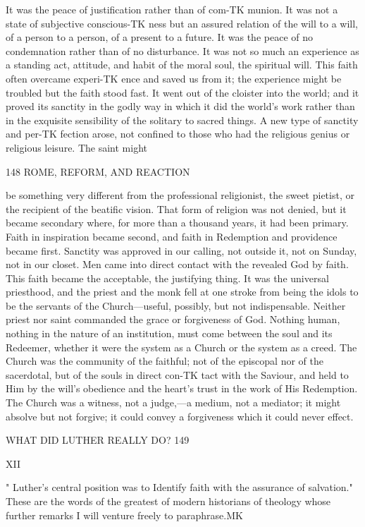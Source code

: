\documentclass[12pt,a5paper,twoside]{book}
\begin{document}
{It was the peace of justification rather than of com-TK
munion. It was not a state of subjective conscious-TK
ness but an assured relation of the will to a will, of 
a person to a person, of a present to a future. It 
was the peace of no condemnation rather than of no 
disturbance. It was not so much an experience as 
a standing act, attitude, and habit of the moral soul, 
the spiritual will. This faith often overcame experi-TK
ence and saved us from it; the experience might be 
troubled but the faith stood fast. It went out of 
the cloister into the world; and it proved its sanctity 
in the godly way in which it did the world's work 
rather than in the exquisite sensibility of the solitary 
to sacred things. A new type of sanctity and per-TK
fection arose, not confined to those who had the 
religious genius or religious leisure. The saint might 



148 ROME, REFORM, AND REACTION 

be something very different from the professional 
religionist, the sweet pietist, or the recipient of the 
beatific vision. That form of religion was not 
denied, but it became secondary where, for more 
than a thousand years, it had been primary. Faith 
in inspiration became second, and faith in Redemption 
and providence became first. Sanctity was approved 
in our calling, not outside it, not on Sunday, not in 
our closet. Men came into direct contact with 
the revealed God by faith. This faith became the 
acceptable, the justifying thing. It was the universal 
priesthood, and the priest and the monk fell at one 
stroke from being the idols to be the servants of 
the Church---useful, possibly, but not indispensable. 
Neither priest nor saint commanded the grace or 
forgiveness of God. Nothing human, nothing in the 
nature of an institution, must come between the soul 
and its Redeemer, whether it were the system as a 
Church or the system as a creed. The Church was 
the community of the faithful; not of the episcopal 
nor of the sacerdotal, but of the souls in direct con-TK
tact with the Saviour, and held to Him by the will's 
obedience and the heart's trust in the work of His 
Redemption. The Church was a witness, not a 
judge,---a medium, not a mediator; it might absolve 
but not forgive; it could convey a forgiveness which 
it could never effect. 



WHAT DID LUTHER REALLY DO? 149 

XII 

" Luther's central position was to Identify faith with 
the assurance of salvation." These are the words of 
the greatest of modern historians of theology whose 
further remarks I will venture freely to paraphrase.MK 

}
\end{document}
